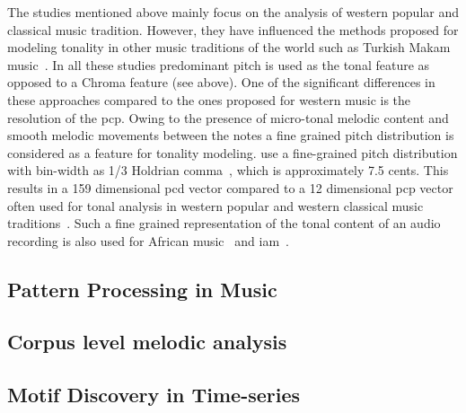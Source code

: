 {The studies mentioned above mainly focus on the analysis of western popular and classical music tradition. However, they have influenced the methods proposed for modeling tonality in other music traditions of the world such as Turkish Makam music~\cite{gedik2010pitch,gedik2009evaluation,bozkurt2008automatic}. In all these studies predominant pitch is used as the tonal feature as opposed to a Chroma feature (see above). One of the significant differences in these approaches compared to the ones proposed for western music is the resolution of the \gls{pcp}. Owing to the presence of micro-tonal melodic content and smooth melodic movements between the notes a fine grained pitch distribution is considered as a feature for tonality modeling. \cite{bozkurt2008automatic,gedik2010pitch} use a fine-grained pitch distribution with bin-width as 1/3 Holdrian comma~\cite{akkocc2002non}, which is approximately 7.5 cents. This results in a 159 dimensional \gls{pcd} vector compared to a 12 dimensional \gls{pcp} vector often used for tonal analysis in western popular and western classical music traditions~\cite{gomez2006tonal}. Such a fine grained representation of the tonal content of an audio recording is also used for African music~\citep{moelants2009exploring} and \acrfull{iam}~\citep{chordia2013joint}. 


\subsection{Pattern Processing in Music}




\subsection{Corpus level melodic analysis}

\subsection{Motif Discovery in Time-series}


}
